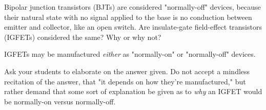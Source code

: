 

Bipolar junction transistors (BJTs) are considered "normally-off" devices, because their natural state with no signal applied to the base is no conduction between emitter and collector, like an open switch.  Are insulate-gate field-effect transistors (IGFETs) considered the same?  Why or why not?







IGFETs may be manufactured {\it either} as "normally-on" or "normally-off" devices.







Ask your students to elaborate on the answer given.  Do not accept a mindless recitation of the answer, that "it depends on how they're manufactured," but rather demand that some sort of explanation be given as to {\it why} an IGFET would be normally-on versus normally-off.





